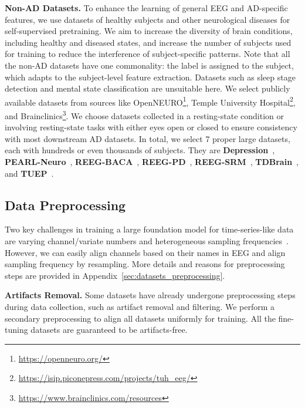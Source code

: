 \textbf{Non-AD Datasets.} To enhance the learning of general EEG and AD-specific features, we use datasets of healthy subjects and other neurological diseases for self-supervised pretraining. We aim to increase the diversity of brain conditions, including healthy and diseased states, and increase the number of subjects used for training to reduce the interference of subject-specific patterns. Note that all the non-AD datasets have one commonality: the label is assigned to the subject, which adapts to the subject-level feature extraction. Datasets such as sleep stage detection and mental state classification are unsuitable here. We select publicly available datasets from sources like OpenNEURO\footnote{\url{https://openneuro.org/}}, Temple University Hospital\footnote{\url{https://isip.piconepress.com/projects/tuh_eeg/}}, and Brainclinics\footnote{\url{https://www.brainclinics.com/resources}}. We choose datasets collected in a resting-state condition or involving resting-state tasks with either eyes open or closed to ensure consistency with most downstream AD datasets. In total, we select 7 proper large datasets, each with hundreds or even thousands of subjects. They are \textbf{Depression}~\cite{cavanagh2019multiple,cavanagh2021eeg}, \textbf{PEARL-Neuro}~\cite{dzianok2024pearl}, \textbf{REEG-BACA}~\cite{getzmann2024resting}, \textbf{REEG-PD}~\cite{singh2023evoked}, \textbf{REEG-SRM}~\cite{hatlestad2022bids}, \textbf{TDBrain}~\cite{van2022two}, and \textbf{TUEP}~\cite{veloso2017big}.




\subsection{Data Preprocessing}
\label{sub:data_preprocessing}

Two key challenges in training a large foundation model for time-series-like data are varying channel/variate numbers and heterogeneous sampling frequencies~\cite{liu2024timer,woo2024unified,yang2024biot}. However, we can easily align channels based on their names in EEG and align sampling frequency by resampling. More details and reasons for preprocessing steps are provided in Appendix~\ref{sec:datasets_preprocessing}.

\textbf{Artifacts Removal.} Some datasets have already undergone preprocessing steps during data collection, such as artifact removal and filtering. We perform a secondary preprocessing to align all datasets uniformly for training. All the fine-tuning datasets are guaranteed to be artifacts-free.

